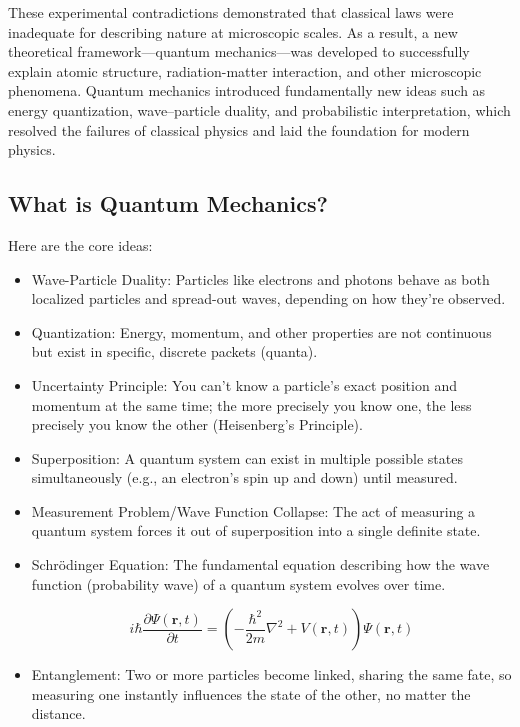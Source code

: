 \documentclass[14pt,a4paper]{extarticle}
\begin{document}
These experimental contradictions demonstrated that classical laws were inadequate for describing nature at microscopic scales. As a result, a new theoretical framework—quantum mechanics—was developed to successfully explain atomic structure, radiation-matter interaction, and other microscopic phenomena. Quantum mechanics introduced fundamentally new ideas such as energy quantization, wave–particle duality, and probabilistic interpretation, which resolved the failures of classical physics and laid the foundation for modern physics.
\subsection{What is Quantum Mechanics?}
Here are the core ideas:
\begin{itemize}
  \item Wave-Particle Duality: Particles like electrons and photons behave as both localized particles and spread-out waves, depending on how they're observed.
  \item Quantization: Energy, momentum, and other properties are not continuous but exist in specific, discrete packets (quanta).
  \item Uncertainty Principle: You can't know a particle's exact position and momentum at the same time; the more precisely you know one, the less precisely you know the other (Heisenberg's Principle).
  \item Superposition: A quantum system can exist in multiple possible states simultaneously (e.g., an electron's spin up and down) until measured.
  \item Measurement Problem/Wave Function Collapse: The act of measuring a quantum system forces it out of superposition into a single definite state.
  \item Schrödinger Equation: The fundamental equation describing how the wave function (probability wave) of a quantum system evolves over time.

\begin{equation*}
i\hbar \frac{\partial \Psi(\mathbf{r},t)}{\partial t}
=
\left(
-\frac{\hbar^2}{2m}\nabla^2 + V(\mathbf{r},t)
\right)
\Psi(\mathbf{r},t)
\end{equation*}

  \item Entanglement: Two or more particles become linked, sharing the same fate, so measuring one instantly influences the state of the other, no matter the distance.

\end{itemize}
\end{document}
